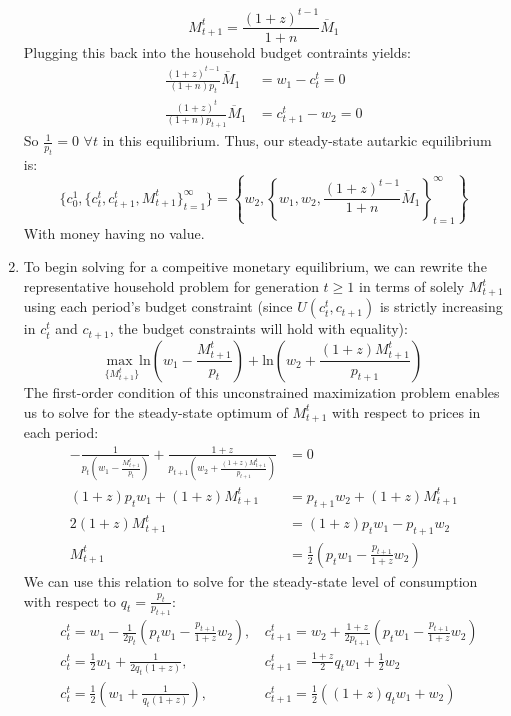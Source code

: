 \documentclass{article}
\newcommand{\loge}[1]{\text{ln}\left(#1\right)}
\newcommand{\usmax}[1]{\underset{\{#1\}}{\text{max }}}
\newcommand{\Mt}{M_{t+1}^t}
\begin{document}
\begin{enumerate}
		\[
			M^t_{t+1} = \frac{(1+z)^{t-1}}{1+n}\overline{M}_1 
		\]
		Plugging this back into the household budget contraints yields:
		\begin{align*}
			\frac{(1+z)^{t-1}}{(1+n)p_t}\overline{M}_1 &= w_1-c_t^t 		= 0 \\
			\frac{(1+z)^t}{(1+n)p_{t+1}}\overline{M}_1 &= c_{t+1}^t - w_2	= 0
		\end{align*}
		So $\frac{1}{p_t}=0$ $\forall t$ in this equilibrium. Thus, our steady-state autarkic equilibrium is:
		\[
			\{c_0^1,\{c_t^t,c^t_{t+1},M_{t+1}^t\}_{t=1}^\infty\} = \left\{w_2,\left\{w_1,w_2,\frac{(1+z)^{t-1}}{1+n}\overline{M}_1 \right\}_{t=1}^\infty\right\}
		\]
		With money having no value.
		
	\item To begin solving for a compeitive monetary equilibrium, we can rewrite the representative household problem for generation $t\geq 1$ in terms of solely $M_{t+1}^t$ using each period's budget constraint (since $U(c_t^t,c_{t+1})$ is strictly increasing in $c_t^t$ and $c_{t+1}$, the budget constraints will hold with equality):
		\[
			\usmax{M_{t+1}^t}\loge{w_1-\frac{M_{t+1}^t}{p_t}} + \loge{w_2 + \frac{(1+z)M_{t+1}^t}{p_{t+1}}}
		\]
		The first-order condition of this unconstrained maximization problem enables us to solve for the steady-state optimum of $\Mt$ with respect to prices in each period:
		\begin{align*}
			-\frac{1}{p_t\left(w_1-\frac{\Mt}{p_t}\right)} + \frac{1+z}{p_{t+1}\left(w_2 + \frac{(1+z)\Mt}{p_{t+1}}\right)} &= 0	\\
			(1+z)p_tw_1 + (1+z)\Mt &= p_{t+1}w_2 + (1+z)\Mt	\\
			2(1+z)\Mt &= (1+z)p_tw_1-p_{t+1}w_2	\\
			\Mt & = \frac{1}{2}\left(p_tw_1 - \frac{p_{t+1}}{1+z}w_2\right)
		\end{align*}
		We can use this relation to solve for the steady-state level of consumption with respect to $q_t=\frac{p_t}{p_{t+1}}$:
		\begin{align*}
			&c_t^t 		= w_1 - \frac{1}{2p_t}\left(p_tw_1 - \frac{p_{t+1}}{1+z}w_2\right)\text{, }
			&c_{t+1}^t 	= w_2 + \frac{1+z}{2p_{t+1}}\left(p_tw_1 - \frac{p_{t+1}}{1+z}w_2\right)											\\
			&c_t^t 		= \frac{1}{2}w_1 + \frac{1}{2q_t(1+z)}\text{, }				& c_{t+1}^t = \frac{1+z}{2}q_tw_1 + \frac{1}{2}w_2		\\
			&c_t^t 		= \frac{1}{2}\left(w_1 + \frac{1}{q_t(1+z)}\right)\text{, }	& c_{t+1}^t = \frac{1}{2}\left((1+z)q_tw_1 + w_2\right)	\\

\end{align*}
\end{enumerate}
\end{document}
